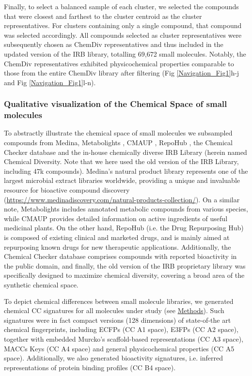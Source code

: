 Finally, to select a balanced sample of each cluster, we selected the compounds that were closest and farthest to the cluster centroid as the cluster representatives. For clusters containing only a single compound, that compound was selected accordingly. All compounds selected as cluster representatives were subsequently chosen as ChemDiv representatives and thus included in the updated version of the IRB library, totalling 69,672 small molecules. Notably, the ChemDiv representatives exhibited physicochemical properties comparable to those from the entire ChemDiv library after filtering (Fig \ref{Navigation_Fig1}h-j and Fig \ref{Navigation_Fig1}l-n). 

\subsubsection{Qualitative visualization of the Chemical Space of small molecules}

To abstractly illustrate the chemical space of small molecules we subsampled compounds from Medina, Metabolights \cite{yurekten_metabolights_2024, haug_metabolights_2019}, CMAUP \cite{zeng_cmaup_2019, hou_cmaup_2024}, RepoHub \cite{corsello_drug_2017}, the Chemical Checker database \cite{duran-frigola_extending_2020} and the in-house chemically diverse IRB Library (herein named Chemical Diversity. Note that we here used the old version of the IRB Library, including 47k compounds). Medina’s natural product library represents one of the largest microbial extract libraries worldwide, providing a unique and invaluable resource for bioactive compound discovery (\href{https://www.medinadiscovery.com/natural-products-collection/}{https://www.medinadiscovery.com/natural-products-collection/}). On a similar note, Metabolights includes annotated metabolic compounds from various species, while CMAUP provides detailed information on active ingredients of useful medicinal plants. On the other hand, RepoHub (i.e. the Drug Repurposing Hub) is composed of existing clinical and marketed drugs, and is mainly aimed at repurposing known drugs for new therapeutic applications. Additionally, the Chemical Checker database comprises compounds with reported bioactivity in the public domain, and finally, the old version of the IRB proprietary library was specifically designed to maximize chemical diversity, covering a broad area of the synthetic chemical space.

To depict chemical differences between small molecule libraries, we generated chemical CC signatures for all molecules under study (see \hyperref[Navigation_Methods]{Methods}). Such signatures were in fact compact versions (128 dimensions) of state-of-the art chemical fingerprints, including ECFPs (CC A1 space), E3FPs (CC A2 space), together with embedded Murcko’s scaffold-based representations (CC A3 space), MACCs Keys (CC A4 space) and general physicochemical properties (CC A5 space). Additionally, we also generated bioactivity signatures, i.e. inferred representations of protein binding profiles (CC B4 space). 

